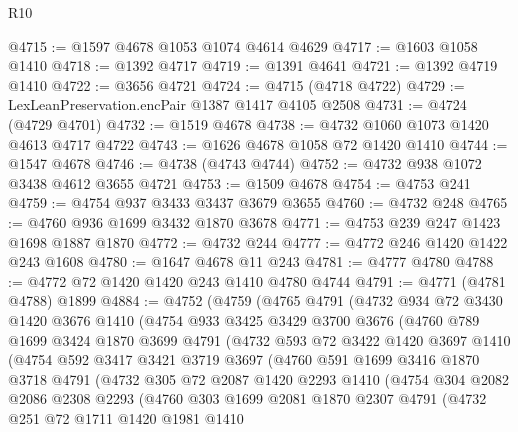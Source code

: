 \begin{lexlean}{R10}
\begin{coremodule}
@4715 := @1597 @4678 @1053 @1074 @4614 @4629
@4717 := @1603 @1058 @1410
@4718 := @1392 @4717
@4719 := @1391 @4641
@4721 := @1392 @4719 @1410
@4722 := @3656 @4721
@4724 := @4715 (@4718 @4722)
@4729 := LexLeanPreservation.encPair @1387 @1417 @4105 @2508
@4731 := @4724 (@4729 @4701)
@4732 := @1519 @4678
@4738 := @4732 @1060 @1073 @1420 @4613 @4717 @4722
@4743 := @1626 @4678 @1058 @72 @1420 @1410
@4744 := @1547 @4678
@4746 := @4738 (@4743 @4744)
@4752 := @4732 @938 @1072 @3438 @4612 @3655 @4721
@4753 := @1509 @4678
@4754 := @4753 @241
@4759 := @4754 @937 @3433 @3437 @3679 @3655
@4760 := @4732 @248
@4765 := @4760 @936 @1699 @3432 @1870 @3678
@4771 := @4753 @239 @247 @1423 @1698 @1887 @1870
@4772 := @4732 @244
@4777 := @4772 @246 @1420 @1422 @243 @1608
@4780 := @1647 @4678 @11 @243
@4781 := @4777 @4780
@4788 := @4772 @72 @1420 @1420 @243 @1410 @4780 @4744
@4791 := @4771 (@4781 @4788) @1899
@4884 := @4752
    (@4759
      (@4765
        @4791
        (@4732
          @934
          @72
          @3430
          @1420
          @3676
          @1410
          (@4754
            @933
            @3425
            @3429
            @3700
            @3676
            (@4760
              @789
              @1699
              @3424
              @1870
              @3699
              @4791
              (@4732
                @593
                @72
                @3422
                @1420
                @3697
                @1410
                (@4754
                  @592
                  @3417
                  @3421
                  @3719
                  @3697
                  (@4760
                    @591
                    @1699
                    @3416
                    @1870
                    @3718
                    @4791
                    (@4732
                      @305
                      @72
                      @2087
                      @1420
                      @2293
                      @1410
                      (@4754
                        @304
                        @2082
                        @2086
                        @2308
                        @2293
                        (@4760
                          @303
                          @1699
                          @2081
                          @1870
                          @2307
                          @4791
                          (@4732
                            @251
                            @72
                            @1711
                            @1420
                            @1981
                            @1410

\end{coremodule}
\end{lexlean}
